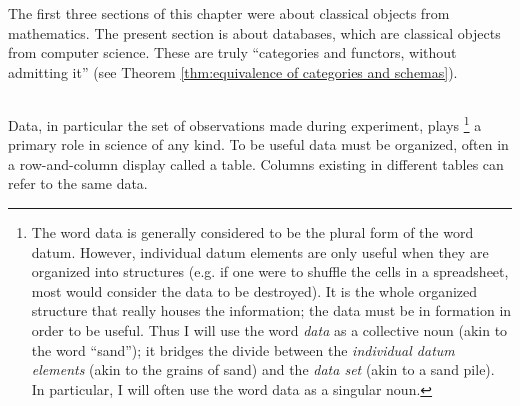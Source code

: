 \documentclass[CT4S-EN-RU]{subfiles}
\begin{document}
\section{}\label{sec:databases}

\begin{blockENG}
The first three sections of this chapter were about classical objects from mathematics. The present section is about databases, which are classical objects from computer science. These are truly “categories and functors, without admitting it” (see Theorem \ref{thm:equivalence of categories and schemas}).
\end{blockENG}

\begin{blockRUS}
\end{blockRUS}


\subsection{}\label{sec:what are dbs}

\begin{blockENG}
Data, in particular the set of observations made during experiment, plays
\footnote{The word data is generally considered to be the plural form of the word datum. However, individual datum elements are only useful when they are organized into structures (e.g. if one were to shuffle the cells in a spreadsheet, most would consider the data to be destroyed). It is the whole organized structure that really houses the information; the data must be in formation in order to be useful. Thus I will use the word {\em data} as a collective noun (akin to the word “sand”); it bridges the divide between the {\em individual datum elements} (akin to the grains of sand) and the {\em data set} (akin to a sand pile). In particular, I will often use the word data as a singular noun.}
a primary role in science of any kind. To be useful data must be organized, often in a row-and-column display called a table. Columns existing in different tables can refer to the same data.
\end{blockENG}

\begin{blockRUS}
\end{blockRUS}
\end{document}
